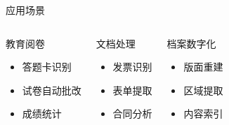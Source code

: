 \begin{frame}{应用场景}
    \begin{columns}
        \begin{block}{教育阅卷}
            \begin{itemize}
                \item 答题卡识别
                \item 试卷自动批改
                \item 成绩统计
            \end{itemize}
        \end{block}

        \begin{block}{文档处理}
            \begin{itemize}
                \item 发票识别
                \item 表单提取
                \item 合同分析
            \end{itemize}
        \end{block}

        \begin{block}{档案数字化}
            \begin{itemize}
                \item 版面重建
                \item 区域提取
                \item 内容索引
            \end{itemize}
        \end{block}
    \end{columns}
\end{frame}
